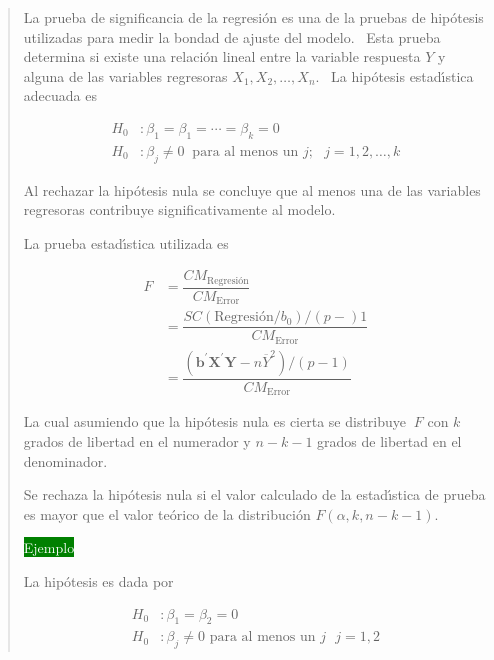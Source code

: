 \documentclass{book}%
\begin{document}
\begin{quotation}
La prueba de significancia de la regresi\'{o}n es una de la pruebas de
hip\'{o}tesis utilizadas para medir la bondad de ajuste del modelo. \ Esta
prueba determina si existe una relaci\'{o}n lineal entre la variable respuesta
$Y$ y alguna de las variables regresoras $X_{1},X_{2},\ldots,X_{n} $. \ La
hip\'{o}tesis estad\'{\i}stica adecuada es

\bigskip%

\begin{align*}
H_{0}  & :\beta_{1}=\beta_{1}=\cdots=\beta_{k}=0\\
H_{0}  & :\beta_{j}\neq0 \ \text{ para al menos un }j;\text{ \ }j=1,2,\ldots,k
\end{align*}


\bigskip

Al rechazar la hip\'{o}tesis nula se concluye que al menos una de las
variables regresoras contribuye significativamente al modelo.

\bigskip

La prueba estad\'{\i}stica utilizada es

\bigskip%

\begin{align*}
F  & =\dfrac{CM_{\text{Regresi\'{o}n}}}{CM_{\text{Error}}}\\
& =\dfrac{SC\left(  \text{Regresi\'{o}n}/b_{0}\right)  /\left(  p-\right)
1}{CM_{\text{Error}}}\\
& =\dfrac{\left(  \mathbf{b}^{\prime}\mathbf{X}^{\prime}\mathbf{Y-}%
n\overline{Y}^{2}\right)  /\left(  p-1\right)  }{CM_{\text{Error}}}%
\end{align*}


\bigskip

La cual asumiendo que la hip\'{o}tesis nula es cierta se distribuye $\ F$ con
$k$ grados de libertad en el numerador y $n-k-1$ grados de libertad en el denominador.

\bigskip

Se rechaza la hip\'{o}tesis nula si el valor calculado de la estad\'{\i}stica
de prueba es mayor que el valor te\'{o}rico de la distribuci\'{o}n $F\left(
\alpha,k,n-k-1\right)  $.

\bigskip\colorbox{green}{\textcolor{white}{ Ejemplo}} \bigskip

La hip\'{o}tesis es dada por%

\begin{align*}
H_{0}  & :\beta_{1}=\beta_{2}=0\\
H_{0}  & :\beta_{j}\neq0\text{ para al menos un }j\text{ \ }j=1,2
\end{align*}



\end{quotation}
\end{document}
